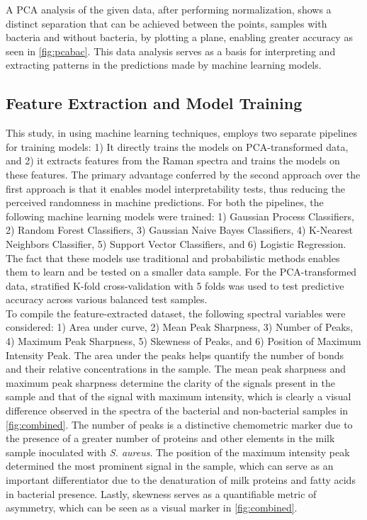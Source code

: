 \noindent A PCA analysis of the given data, after performing normalization, shows a distinct separation that can be achieved between the points, samples with bacteria and without bacteria, by plotting a plane, enabling greater accuracy as seen in \autoref{fig:pcabac}. This data analysis serves as a basis for interpreting and extracting patterns in the predictions made by machine learning models. 

\subsection{Feature Extraction and Model Training }

This study, in using machine learning techniques, employs two separate pipelines for training models: 1) It directly trains the models on PCA-transformed data, and 2) it extracts features from the Raman spectra and trains the models on these features. The primary advantage conferred by the second approach over the first approach is that it enables model interpretability tests, thus reducing the perceived randomness in machine predictions. For both the pipelines, the following machine learning models were trained: 1) Gaussian Process Classifiers, 2) Random Forest Classifiers, 3) Gaussian Naive Bayes Classifiers, 4) K-Nearest Neighbors Classifier, 5) Support Vector Classifiers, and 6) Logistic Regression. The fact that these models use traditional and probabilistic methods enables them to learn and be tested on a smaller data sample. For the PCA-transformed data, stratified K-fold cross-validation with 5 folds was used to test predictive accuracy across various balanced test samples. \\

\noindent To compile the feature-extracted dataset, the following spectral variables were considered: 1) Area under curve, 2) Mean Peak Sharpness, 3) Number of Peaks, 4) Maximum Peak Sharpness, 5) Skewness of Peaks, and 6) Position of Maximum Intensity Peak. The area under the peaks helps quantify the number of bonds and their relative concentrations in the sample. The mean peak sharpness and maximum peak sharpness determine the clarity of the signals present in the sample and that of the signal with maximum intensity, which is clearly a visual difference observed in the spectra of the bacterial and non-bacterial samples in \autoref{fig:combined}. The number of peaks is a distinctive chemometric marker due to the presence of a greater number of proteins and other elements in the milk sample inoculated with \textit{S. aureus}. The position of the maximum intensity peak determined the most prominent signal in the sample, which can serve as an important differentiator due to the denaturation of milk proteins and fatty acids in bacterial presence. Lastly, skewness serves as a quantifiable metric of asymmetry, which can be seen as a visual marker in \autoref{fig:combined}. \\

